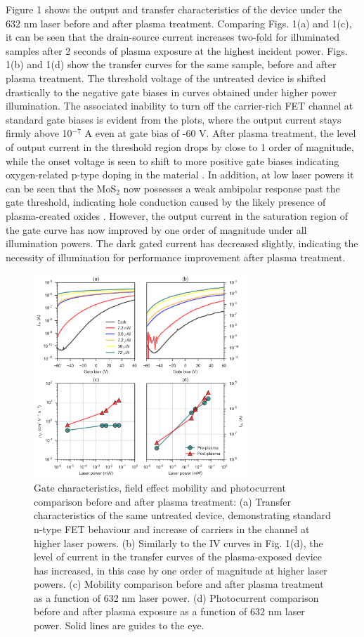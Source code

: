 \documentclass[%
 reprint,
superscriptaddress,
 amsmath,amssymb,
 aps,
prb,
]{revtex4-1}
\begin{document}
\indent Figure 1 shows the output and transfer characteristics of the device under the 632 nm laser before and after plasma treatment. Comparing Figs. 1(a) and 1(c), it can be seen that the drain-source current increases two-fold for illuminated samples after 2 seconds of plasma exposure at the highest incident power. Figs. 1(b) and 1(d) show the transfer curves for the same sample, before and after plasma treatment. The threshold voltage of the untreated device is shifted drastically to the negative gate biases in curves obtained under higher power illumination. The associated inability to turn off the carrier-rich FET channel at standard gate biases is evident from the plots, where the output current stays firmly above 10$^{-7}$ A even at gate bias of -60 V. After plasma treatment, the level of output current in the threshold region drops by close to 1 order of magnitude, while the onset voltage is seen to shift to more positive gate biases indicating oxygen-related p-type doping in the material \cite{giannazzo2017ambipolar,guo2017observation}. In addition, at low laser powers it can be seen that the MoS$_2$ now possesses a weak ambipolar response past the gate threshold, indicating hole conduction caused by the likely presence of plasma-created oxides \cite{chuang2014mos2, mcdonnell2014hole}. However, the output current in the saturation region of the gate curve has now improved by one order of magnitude under all illumination powers. The dark gated current has decreased slightly, indicating the necessity of illumination for performance improvement after plasma treatment.
\begin{center}
\begin{figure}[!htb]
\includegraphics[width=80mm]{Fig_2.png}
\caption{Gate characteristics, field effect mobility and photocurrent comparison before and after plasma treatment: (a) Transfer characteristics of the same untreated device, demonstrating standard n-type FET behaviour and increase of carriers in the channel at higher laser powers. (b) Similarly to the IV curves in Fig. 1(d), the level of current in the transfer curves of the plasma-exposed device has increased, in this case by one order of magnitude at higher laser powers. (c) Mobility comparison before and after plasma treatment as a function of 632 nm laser power. (d) Photocurrent comparison before and after plasma exposure as a function of 632 nm laser power. Solid lines are guides to the eye.}
\end{figure}
\end{center}
\end{document}
